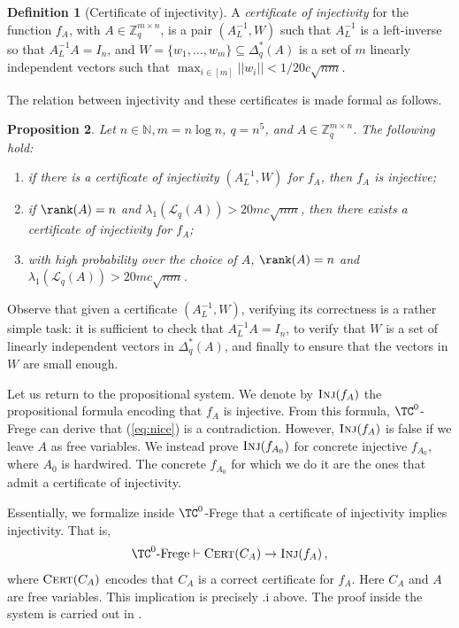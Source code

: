 \documentclass[11pt]{article}
\theoremstyle{definition}
\newtheorem{definition}{Definition}[section]
\theoremstyle{plain}
\newtheorem{proposition}[definition]{Proposition}
\theoremstyle{remark}
\newcommand{\LL}{\mathcal{L}}
\newcommand{\bZ}{\mathbb{Z}}
\begin{document}
\begin{definition}[Certificate of injectivity]
\label{def:cert-inj}
    A \emph{certificate of injectivity} for the function $f_A$, with $A \in \mathbb{Z}_q^{m \times n}$, is a pair $(A^{-1}_L, W)$ such that $A^{-1}_L$ is a left-inverse so that $A^{-1}_L A = I_n$, and $W = \{ w_1, \dots, w_m\} \subseteq \Delta_q^*(A)$ is a set of $m$ linearly independent vectors such that $\max_{i \in [m]} ||w_i|| <  1/20c\sqrt{nm}$.
\end{definition}

The relation between injectivity and these certificates is made formal as follows.

\begin{proposition}
\label{prop:W-equivalence}
    Let $n \in \mathbb{N}, m = n\log n$, $q = n^{5}$, and $A \in \bZ^{m\times n}_q$. The following hold:
    \begin{enumerate}
        \item[(i)] if there is a certificate of injectivity $(A^{-1}_L, W)$ for $f_A$, then $f_A$ is injective;
        \item[(ii)] if $\rank(A) = n$ and $\lambda_1(\LL_q(A)) > 20mc\sqrt{nm}$, then there exists a certificate of injectivity for $f_A$;
        \item[(iii)] with high probability over the choice of $A$, $\rank(A) = n$ and $\lambda_1(\LL_q(A)) > 20mc\sqrt{nm}$.
    \end{enumerate}
\end{proposition}


Observe that given a certificate $(A^{-1}_L, W)$, verifying its correctness is a rather simple task: it is sufficient to check that $A^{-1}_L A = I_n$, to verify that  $W$ is a set of linearly independent vectors in $\Delta_q^*(A)$, and finally to ensure that the vectors in $W$ are small enough.

Let us return to the propositional system. We denote by $\operatorname{\textsc{Inj}}(f_{A})$ the propositional formula encoding that $f_A$ is injective. From this formula, $\TC^0$-Frege can derive that (\ref{eq:nice}) is a contradiction. However, $\operatorname{\textsc{Inj}}(f_{A})$ is false if we leave $A$ as free variables. We instead prove $\operatorname{\textsc{Inj}}(f_{A_0})$ for concrete injective $f_{A_0}$, where $A_0$ is hardwired. The concrete $f_{A_0}$ for which we do it are the ones that admit a certificate of injectivity.

Essentially, we formalize inside $\TC^0$-Frege that a certificate of injectivity implies injectivity. That is,
\begin{equation}
\label{eq:implication}
    \TC^0\text{-Frege} \vdash \operatorname{\textsc{Cert}}(C_A) \to \operatorname{\textsc{Inj}}(f_A)\,,
\end{equation}
where $\operatorname{\textsc{Cert}}(C_A)$ encodes that $C_A$ is a correct certificate for $f_A$. Here $C_A$ and $A$ are free variables. This implication is precisely .i above. The proof inside the system is carried out in .
\end{document}
